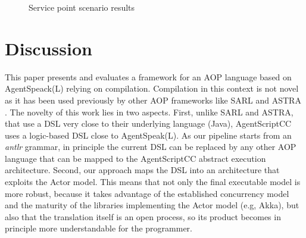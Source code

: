 \begin{figure}[bt!]
\caption{Service point scenario results}
\label{fig:ping_pong1}
\end{figure}

\section{Discussion}
\label{sec:discussion}
This paper presents and evaluates a framework for an AOP language based on AgentSpeack(L) relying on compilation. Compilation in this context is not novel as it has been used previously by other AOP frameworks like SARL \cite{Sarl} and ASTRA \cite{Astra}. The novelty of this work lies in two aspects. First, unlike SARL and ASTRA, that use a DSL very close to their underlying language (Java), AgentScriptCC uses a logic-based DSL close to AgentSpeak(L). %
As our pipeline starts from an \textit{antlr} grammar, in principle 
the current DSL can be replaced by any other AOP language that can be mapped to the AgentScriptCC abstract execution architecture. Second, our approach maps the DSL into an architecture that exploits the Actor model. This means that not only the final executable model is more robust, because it takes advantage of the established concurrency model and the maturity of the libraries implementing the Actor model (e.g, Akka), but also that the translation itself is an open process, so its product becomes in principle more understandable for the programmer.


